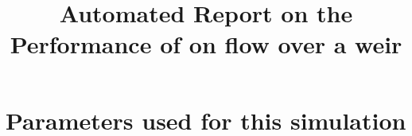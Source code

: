 \documentclass[11pt,a4paper]{article}%
\begin{document}
 

\title{Automated Report on the Performance of \anuga{} on flow over a weir}
\maketitle




\section{Parameters used for this simulation}






\end{document}
